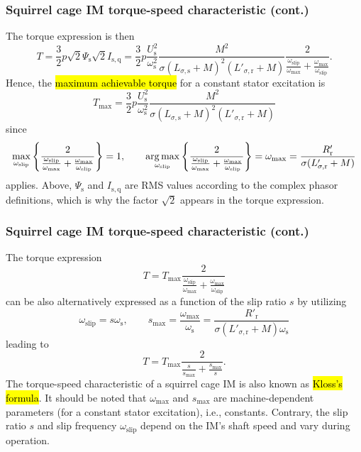 \begin{frame}
	\frametitle{Squirrel cage IM torque-speed characteristic (cont.)}
	The torque expression is then
	\begin{equation}
		T = \frac{3}{2} p \sqrt{2}\Psi_\mathrm{s} \sqrt{2}I_\mathrm{s,q} = \frac{3}{2} p \frac{U_\mathrm{s}^2}{\omega_\mathrm{s}^2}\frac{M^2}{\sigma (L_{\sigma,\mathrm{s}} +M)^2(L'_{\sigma,\mathrm{r}} +M)}\frac{2}{\frac{\omega_\mathrm{slip}}{\omega_\mathrm{max}} + \frac{\omega_\mathrm{max}}{\omega_\mathrm{slip}}}.
	\end{equation}
	\pause
	Hence, the \hl{maximum achievable torque} for a constant stator excitation is
	\begin{equation}
		T_\mathrm{max} = \frac{3}{2} p \frac{U_\mathrm{s}^2}{\omega_\mathrm{s}^2}\frac{M^2}{\sigma (L_{\sigma,\mathrm{s}} +M)^2(L'_{\sigma,\mathrm{r}} +M)}
	\end{equation}
	\pause
	since
	$$ \max_{\omega_{\mathrm{slip}}} \left\{\frac{2}{\frac{\omega_\mathrm{slip}}{\omega_\mathrm{max}} + \frac{\omega_\mathrm{max}}{\omega_\mathrm{slip}}}\right\} = 1, \qquad \operatorname*{arg\,max}_{\omega_{\mathrm{slip}}} \left\{\frac{2}{\frac{\omega_\mathrm{slip}}{\omega_\mathrm{max}} + \frac{\omega_\mathrm{max}}{\omega_\mathrm{slip}}}\right\} = \omega_\mathrm{max}=\frac{R'_\mathrm{r}}{\sigma (L'_{\sigma,\mathrm{r}} +M)}$$
	applies. \pause Above, $\Psi_\mathrm{s}$ and $I_\mathrm{s,q}$ are RMS values according to the complex phasor definitions, which is why the factor $\sqrt{2}$ appears in the torque expression.
\end{frame}

\begin{frame}
	\frametitle{Squirrel cage IM torque-speed characteristic (cont.)}
	The torque expression
	\begin{equation}
		T = T_\mathrm{max} \frac{2}{\frac{\omega_\mathrm{slip}}{\omega_\mathrm{max}} + \frac{\omega_\mathrm{max}}{\omega_\mathrm{slip}}}
	\end{equation}
	can be also alternatively expressed as a function of the slip ratio $s$ \pause by utilizing
	$$
		\omega_\mathrm{slip} = s \omega_\mathrm{s}, \qquad s_\mathrm{max} = \frac{\omega_\mathrm{max}}{\omega_\mathrm{s}} = \frac{R'_\mathrm{r}}{\sigma (L'_{\sigma,\mathrm{r}} +M)\omega_\mathrm{s}}
	$$
	\pause
	leading to
	\begin{equation}
		T = T_\mathrm{max} \frac{2}{\frac{s}{s_\mathrm{max}} + \frac{s_\mathrm{max}}{s}}.
	\end{equation}
	\pause
	The torque-speed characteristic of a squirrel cage IM is also known as \hl{Kloss's formula}. \pause It should be noted that $\omega_\mathrm{max}$ and $s_\mathrm{max}$ are machine-dependent parameters (for a constant stator excitation), i.e., constants. Contrary, the slip ratio $s$ and slip frequency $\omega_\mathrm{slip}$ depend on the IM's shaft speed and vary during operation.
\end{frame}

